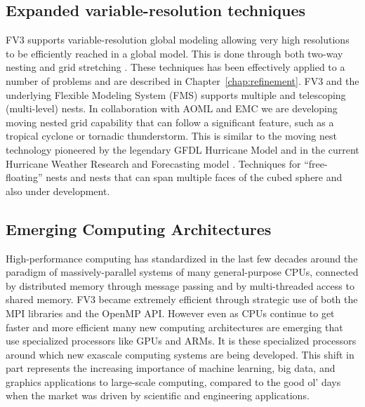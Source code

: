 \documentclass[10pt,letterpaper,margin=1in]{memoir}
\begin{document}

\subsection{Expanded variable-resolution techniques}

FV3 supports variable-resolution global modeling allowing very high resolutions to be efficiently reached in a global model. This is done through both two-way nesting \citep{HL13} and grid stretching \citep{HLT16}. These techniques has been effectively applied to a number of problems \citep{Hazelton2018a,Hazelton2018b,Gao2019,Zhou2019,Zhang2019,Gallo2019,Harris2020} and are described in Chapter~\ref{chap:refinement}. FV3 and the underlying Flexible Modeling System (FMS) supports multiple and telescoping (multi-level) nests. 
In collaboration with AOML and EMC we are developing moving nested grid capability that can follow a significant feature, such as a tropical cyclone or tornadic thunderstorm. This is similar to the moving nest technology pioneered by the legendary GFDL Hurricane Model \citep{Kurihara1979} and in the current Hurricane Weather Research and Forecasting model \citep[HWRF; ][]{Gopalakrishnan2006}. Techniques for ``free-floating'' nests and nests that can span multiple faces of the cubed sphere and also under development. 

\subsection{Emerging Computing Architectures}

High-performance computing has standardized in the last few decades around the paradigm of massively-parallel systems of many general-purpose CPUs, connected by distributed memory through message passing and by multi-threaded access to shared memory. FV3 became extremely efficient through strategic use of both the MPI libraries and the OpenMP API. However even as CPUs continue to get faster and more efficient many new computing architectures are emerging that use specialized processors like GPUs and ARMs. It is these specialized processors around which new exascale computing systems are being developed. This shift in part represents the increasing importance of machine learning, big data, and graphics applications to large-scale computing, compared to the good ol' days when the market was driven by scientific and engineering applications. 
\end{document}
